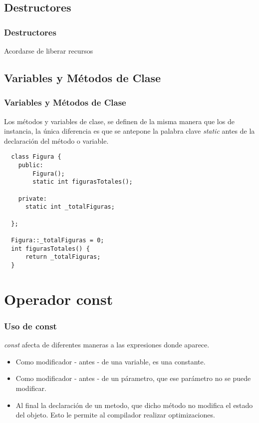 \documentclass{beamer}
\begin{document}
\subsection{Destructores}
\begin{frame}
\frametitle{Destructores}

\begin{block}
Acordarse de liberar recursos
\end{block}

\end{frame}

\subsection{Variables y Métodos de Clase}
\begin{frame}[fragile]
\frametitle{Variables y Métodos de Clase}
   Los métodos y variables de clase, se definen de la misma manera que los de instancia, la única diferencia
   es que se antepone la palabra clave \emph{static} antes de la declaración del método o variable. \\
\end{frame}

\begin{frame}[fragile]
\begin{verbatim}
  class Figura {
    public:
        Figura();
        static int figurasTotales();

    private:
      static int _totalFiguras;

  };

  Figura::_totalFiguras = 0;
  int figurasTotales() {
      return _totalFiguras;
  }
\end{verbatim}

\end{frame}

\section{Operador const}
\begin{frame}
\frametitle{Uso de const}
  \emph{const} afecta de diferentes maneras a las expresiones donde aparece.

\begin{itemize}
 \item Como modificador - antes - de una variable, es una constante.
 \item Como modificador - antes - de un párametro, que ese parámetro no se puede modificar.

 \item Al final la declaración de un metodo, que dicho método no modifica el estado del objeto. Esto le permite al compilador realizar optimizaciones.
\end{itemize}
\end{frame}
\end{document}
